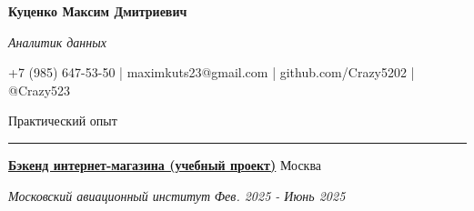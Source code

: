 \documentclass[14pt, a4paper, oneside]{extarticle}
\begin{document}



\begin{center}
    \textbf{\LARGE Куценко Максим Дмитриевич}
    
    \textit{\Large Аналитик данных}
\end{center}

\begin{center}
	\vspace{-0.5\intextsep}
	\small
    \faPhone* \space +7 (985) 647-53-50 | \faEnvelope \space maximkuts23@gmail.com | \faGithub \space github.com/Crazy5202 | \faTelegram \space @Crazy523
\end{center}


\begin{flushleft}
	\vspace{-\intextsep}
	\large Практический опыт
\end{flushleft}

\vspace{-0.8\intextsep}
\hrule


\begin{flushleft}
	\vspace{-0.8\intextsep}
	\quad
	\href{https://github.com/Crazy5202/eComm}{\textbf{Бэкенд интернет-магазина (учебный проект)}}
	\hfill
	Москва
\end{flushleft}

\begin{flushleft}
	\vspace{-1\intextsep}
	\quad
	\textit{Московский авиационный институт}
	\hfill
	\textit{\small Фев. 2025 - Июнь 2025}
\end{flushleft}

\end{document}
